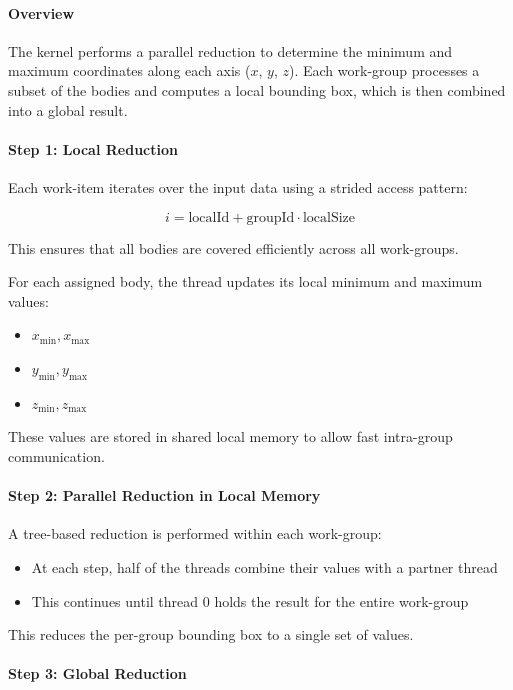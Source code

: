 \documentclass[12pt]{article}
\begin{document}
\paragraph{Overview}

The kernel performs a parallel reduction to determine the minimum and maximum coordinates along each axis ($x$, $y$, $z$).
Each work-group processes a subset of the bodies and computes a local bounding box, which is then combined into a global result.

\paragraph{Step 1: Local Reduction}

Each work-item iterates over the input data using a strided access pattern:

\[
i = \text{localId} + \text{groupId} \cdot \text{localSize}
\]

This ensures that all bodies are covered efficiently across all work-groups.

For each assigned body, the thread updates its local minimum and maximum values:
\begin{itemize}
    \item $x_{\min}, x_{\max}$
    \item $y_{\min}, y_{\max}$
    \item $z_{\min}, z_{\max}$
\end{itemize}

These values are stored in shared local memory to allow fast intra-group communication.

\paragraph{Step 2: Parallel Reduction in Local Memory}

A tree-based reduction is performed within each work-group:

\begin{itemize}
    \item At each step, half of the threads combine their values with a partner thread
    \item This continues until thread $0$ holds the result for the entire work-group
\end{itemize}

This reduces the per-group bounding box to a single set of values.

\paragraph{Step 3: Global Reduction}
\end{document}
